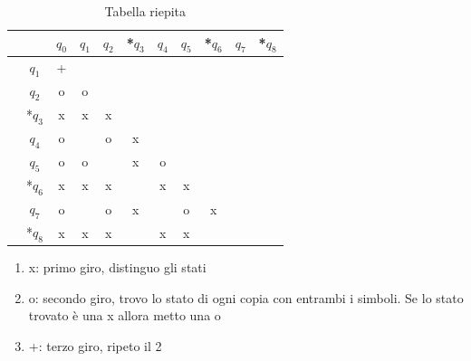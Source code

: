 \begin{enumerate}
      \begin{table}[ht]
          \centering
          \begin{tabular}{c c| c | c | c | c | c | c | c | c | c}
              && $q_0$ & $q_1$ & $q_2$ & *$q_3$ & $q_4$ & $q_5$ & *$q_6$ & $q_7$ & *$q_8$ \\
              \hline
              & $q_1$ &+\\
              \hline
              & $q_2$ &o&o\\
              \hline
              &*$q_3$ &x&x&x\\
              \hline
              & $q_4$ &o& &o&x\\
              \hline
              & $q_5$ &o&o& &x&o\\
              \hline
              &*$q_6$ &x&x&x& &x&x\\
              \hline
              & $q_7$ &o& &o&x& &o&x\\
              \hline
              &*$q_8$ &x&x&x& &x&x& & \\
          \end{tabular}
          \caption{Tabella riepita}
      \end{table}
      \begin{enumerate}
          \item x: primo giro, distinguo gli stati 
          \item o: secondo giro, trovo lo stato di ogni copia con entrambi i simboli. Se lo stato trovato è una x allora metto una o
          \item +: terzo giro, ripeto il 2
      \end{enumerate}
\end{enumerate}
